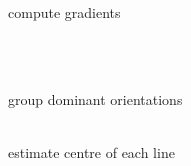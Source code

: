 \documentclass[12pt,a4paper,oneside,openright]{book}
\begin{document}
\begin{CJK}{UTF8}{}
\begin{figure}[htbp]
\begin{center}
\begin{minipage}[t]{.32\textwidth}
\begin{center}
        compute gradients
      \end{center}
    \end{minipage}\medskip\\
    \begin{minipage}[t]{.32\textwidth}
      \begin{center}
        \\
        group dominant orientations
      \end{center}
    \end{minipage}
    \begin{minipage}[t]{.32\textwidth}
      \begin{center}
        \\
        estimate centre of each line
      \end{center}
    \end{minipage}
    \begin{minipage}[t]{.32\textwidth}
      \begin{center}
        \\

\end{center}
\end{minipage}
\end{center}
\end{figure}
\end{CJK}
\end{document}
